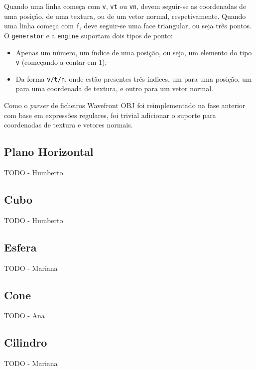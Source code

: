 \documentclass[12pt, a4paper]{article}
\begin{document}
Quando uma linha começa com \texttt{v}, \texttt{vt} ou \texttt{vn}, devem seguir-se as coordenadas
de uma posição, de uma textura, ou de um vetor normal, respetivamente. Quando uma linha começa com
\texttt{f}, deve seguir-se uma face triangular, ou seja três pontos. O \texttt{generator} e a
\texttt{engine} suportam dois tipos de ponto:

\begin{itemize}
    \item Apenas um número, um índice de uma posição, ou seja, um elemento do tipo \texttt{v}
        (começando a contar em 1);
    \item Da forma \texttt{v/t/n}, onde estão presentes três índices, um para uma posição, um para
        uma coordenada de textura, e outro para um vetor normal.
\end{itemize}

Como o \emph{parser} de ficheiros Wavefront OBJ foi reimplementado na fase anterior com base em
expressões regulares, foi trivial adicionar o suporte para coordenadas de textura e vetores normais.

\subsection{Plano Horizontal}

{\color{red} TODO - Humberto}

\subsection{Cubo}

{\color{red} TODO - Humberto}

\subsection{Esfera}

{\color{red} TODO - Mariana}

\subsection{Cone}

{\color{red} TODO - Ana}

\subsection{Cilindro}

{\color{red} TODO - Mariana}
\end{document}
